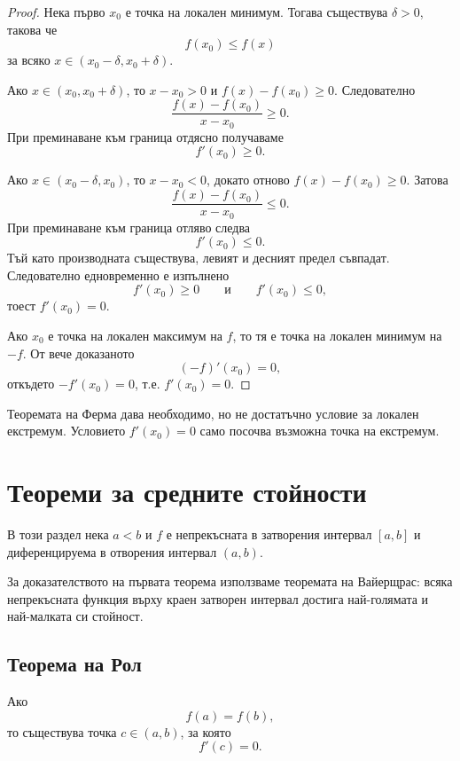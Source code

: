 \begin{proof}
Нека първо $x_0$ е точка на локален минимум. Тогава съществува $\delta>0$, такова че
\[
f(x_0)\leq f(x)
\]
за всяко $x\in(x_0-\delta,x_0+\delta)$.

Ако $x\in(x_0,x_0+\delta)$, то $x-x_0>0$ и $f(x)-f(x_0)\geq 0$. Следователно
\[
\frac{f(x)-f(x_0)}{x-x_0}\geq 0.
\]
При преминаване към граница отдясно получаваме
\[
f'(x_0)\geq 0.
\]

Ако $x\in(x_0-\delta,x_0)$, то $x-x_0<0$, докато отново $f(x)-f(x_0)\geq 0$. Затова
\[
\frac{f(x)-f(x_0)}{x-x_0}\leq 0.
\]
При преминаване към граница отляво следва
\[
f'(x_0)\leq 0.
\]
Тъй като производната съществува, левият и десният предел съвпадат. Следователно едновременно е изпълнено
\[
f'(x_0)\geq 0
\qquad\text{и}\qquad
f'(x_0)\leq 0,
\]
тоест $f'(x_0)=0$.

Ако $x_0$ е точка на локален максимум на $f$, то тя е точка на локален минимум на $-f$. От вече доказаното
\[
(-f)'(x_0)=0,
\]
откъдето $-f'(x_0)=0$, т.е. $f'(x_0)=0$.
\end{proof}

\begin{remark}
Теоремата на Ферма дава необходимо, но не достатъчно условие за локален екстремум. Условието $f'(x_0)=0$ само посочва възможна точка на екстремум.
\end{remark}

\section{Теореми за средните стойности}\label{s:32.2}

В този раздел нека $a<b$ и $f$ е непрекъсната в затворения интервал $[a,b]$ и диференцируема в отворения интервал $(a,b)$.

За доказателството на първата теорема използваме теоремата на Вайерщрас: всяка непрекъсната функция върху краен затворен интервал достига най-голямата и най-малката си стойност.

\subsection{Теорема на Рол}\label{s:32.2.1}

\begin{keythm}
Ако
\[
f(a)=f(b),
\]
то съществува точка $c\in(a,b)$, за която
\[
f'(c)=0.
\]
\end{keythm}

